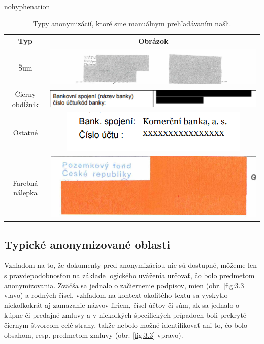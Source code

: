 \begin{hyphenrules}{nohyphenation}
\begin{table}[H]
\centering
\caption{Typy anonymizácií, ktoré sme manuálnym prehľadávaním našli.}
\label{table:3.2}
\begin{tabular}{|c|c|}
\hline
\textbf{Typ} & \textbf{Obrázok} \\ \hline
Šum & \includegraphics[width=0.5\linewidth]{img/2577_sum.png} \\ \hline
Čierny obdĺžnik & \includegraphics[width=0.5\linewidth]{img/2736_sum.png} \\ \hline
Ostatné & \includegraphics[width=0.5\linewidth]{img/4756_sum.png} \\ \hline
Farebná nálepka & \includegraphics[width=0.5\linewidth]{img/798_sum.png} \\ \hline
\end{tabular}
\end{table}


\subsection{Typické anonymizované oblasti}
Vzhľadom na to, že dokumenty pred anonymizáciou nie sú dostupné, môžeme len s pravdepodobnosťou na základe logického uváženia určovať, čo bolo predmetom anonymizovania. Zväčša sa jednalo o začiernenie podpisov, mien (obr. \ref{fig:3.3} vľavo) a rodných čísel, vzhľadom na kontext okolitého textu sa vyskytlo niekoľkokrát aj zamazanie názvov firiem, čísel účtov či súm, ak sa jednalo o kúpne či predajné zmluvy a v niekoľkých špecifických prípadoch boli prekryté čiernym štvorcom celé strany, takže nebolo možné identifikovať ani to, čo bolo obsahom, resp. predmetom zmluvy (obr. \ref{fig:3.3} vpravo). 


\end{hyphenrules}
